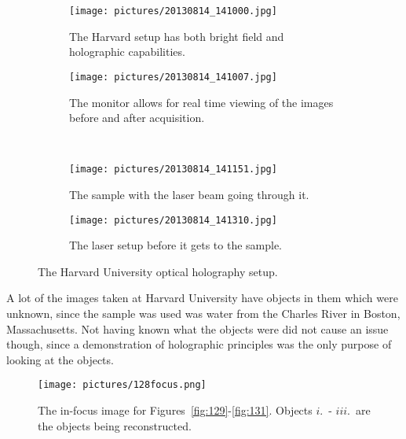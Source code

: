 \begin{figure}[ht!]
    \begin{center}

        \begin{subfigure}[t]{0.4\textwidth}
            \label{fig:second}
            \texttt{[image: pictures/20130814\_141000.jpg]}
            \caption{The Harvard setup has both bright field and holographic
            capabilities.}
        \end{subfigure}
                \hspace*{\fill}
        \begin{subfigure}[t]{0.4\textwidth}
            \label{fig:third}
            \texttt{[image: pictures/20130814\_141007.jpg]}
            \caption{The monitor allows for real time viewing of the images
            before and after acquisition.}
        \end{subfigure}
        \\

        \begin{subfigure}[t]{0.4\textwidth}
            \label{fig:fourth}
            \texttt{[image: pictures/20130814\_141151.jpg]}
            \caption{The sample with the laser beam going through it.}
        \end{subfigure}
        \hspace*{\fill}
        \begin{subfigure}[t]{0.4\textwidth}%
            \label{fig:fifth}
            \texttt{[image: pictures/20130814\_141310.jpg]}
            \caption{The laser setup before it gets to the sample.}
        \end{subfigure}

    \end{center}
    \caption{%
        The Harvard University optical holography setup.
    }%
    \label{fig:harvardSetup}
\end{figure}

A lot of the images taken at Harvard University have objects in them which were
unknown, since the sample was used was water from the Charles River in Boston,
Massachusetts. Not
having known what the objects were did not cause an issue though, since
a demonstration of holographic principles was the only purpose of looking at the objects.


\begin{figure}
    \begin{center}
        \texttt{[image: pictures/128focus.png]}
        \caption{The in-focus image for Figures~\ref{fig:129}-\ref{fig:131}.
    Objects $i.$\ - $iii.$\ are the objects being reconstructed. }
        \label{fig:128focus}
    \end{center}
\end{figure}


